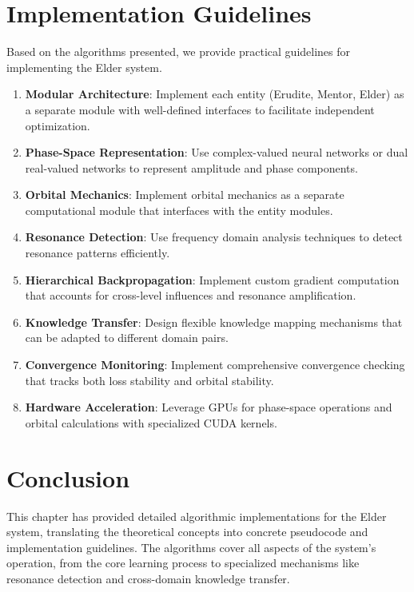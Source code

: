 \section{Implementation Guidelines}

Based on the algorithms presented, we provide practical guidelines for implementing the Elder system.

\begin{enumerate}
    \item \textbf{Modular Architecture}: Implement each entity (Erudite, Mentor, Elder) as a separate module with well-defined interfaces to facilitate independent optimization.
    
    \item \textbf{Phase-Space Representation}: Use complex-valued neural networks or dual real-valued networks to represent amplitude and phase components.
    
    \item \textbf{Orbital Mechanics}: Implement orbital mechanics as a separate computational module that interfaces with the entity modules.
    
    \item \textbf{Resonance Detection}: Use frequency domain analysis techniques to detect resonance patterns efficiently.
    
    \item \textbf{Hierarchical Backpropagation}: Implement custom gradient computation that accounts for cross-level influences and resonance amplification.
    
    \item \textbf{Knowledge Transfer}: Design flexible knowledge mapping mechanisms that can be adapted to different domain pairs.
    
    \item \textbf{Convergence Monitoring}: Implement comprehensive convergence checking that tracks both loss stability and orbital stability.
    
    \item \textbf{Hardware Acceleration}: Leverage GPUs for phase-space operations and orbital calculations with specialized CUDA kernels.
\end{enumerate}

\section{Conclusion}

This chapter has provided detailed algorithmic implementations for the Elder system, translating the theoretical concepts into concrete pseudocode and implementation guidelines. The algorithms cover all aspects of the system's operation, from the core learning process to specialized mechanisms like resonance detection and cross-domain knowledge transfer.

